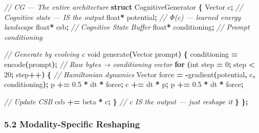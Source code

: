 \documentclass[
  11pt,
  a4paper,
]{article}
\newenvironment{Shaded}{\begin{snugshade}}{\end{snugshade}}
\newcommand{\CommentTok}[1]{\textcolor[rgb]{0.56,0.35,0.01}{\textit{#1}}}
\newcommand{\ControlFlowTok}[1]{\textcolor[rgb]{0.13,0.29,0.53}{\textbf{#1}}}
\newcommand{\DataTypeTok}[1]{\textcolor[rgb]{0.13,0.29,0.53}{#1}}
\newcommand{\DecValTok}[1]{\textcolor[rgb]{0.00,0.00,0.81}{#1}}
\newcommand{\FloatTok}[1]{\textcolor[rgb]{0.00,0.00,0.81}{#1}}
\newcommand{\KeywordTok}[1]{\textcolor[rgb]{0.13,0.29,0.53}{\textbf{#1}}}
\newcommand{\NormalTok}[1]{#1}
\newcommand{\OperatorTok}[1]{\textcolor[rgb]{0.81,0.36,0.00}{\textbf{#1}}}
\begin{document}
\begin{Shaded}
\begin{Highlighting}[]
\CommentTok{// CG — The entire architecture}
\KeywordTok{struct}\NormalTok{ CognitiveGenerator }\OperatorTok{\{}
\NormalTok{    Vector c}\OperatorTok{;}              \CommentTok{// Cognitive state — IS the output}
    \DataTypeTok{float}\OperatorTok{*}\NormalTok{ potential}\OperatorTok{;}      \CommentTok{// Φ(c) — learned energy landscape}
    \DataTypeTok{float}\OperatorTok{*}\NormalTok{ csb}\OperatorTok{;}            \CommentTok{// Cognitive State Buffer}
    \DataTypeTok{float}\OperatorTok{*}\NormalTok{ conditioning}\OperatorTok{;}   \CommentTok{// Prompt conditioning}
    
    \CommentTok{// Generate by evolving c}
    \DataTypeTok{void}\NormalTok{ generate}\OperatorTok{(}\NormalTok{Vector prompt}\OperatorTok{)} \OperatorTok{\{}
\NormalTok{        conditioning }\OperatorTok{=}\NormalTok{ encode}\OperatorTok{(}\NormalTok{prompt}\OperatorTok{);}  \CommentTok{// Raw bytes → conditioning vector}
        \ControlFlowTok{for} \OperatorTok{(}\DataTypeTok{int}\NormalTok{ step }\OperatorTok{=} \DecValTok{0}\OperatorTok{;}\NormalTok{ step }\OperatorTok{\textless{}} \DecValTok{20}\OperatorTok{;}\NormalTok{ step}\OperatorTok{++)} \OperatorTok{\{}
            \CommentTok{// Hamiltonian dynamics}
\NormalTok{            Vector force }\OperatorTok{=} \OperatorTok{{-}}\NormalTok{gradient}\OperatorTok{(}\NormalTok{potential}\OperatorTok{,}\NormalTok{ c}\OperatorTok{,}\NormalTok{ conditioning}\OperatorTok{);}
\NormalTok{            p }\OperatorTok{+=} \FloatTok{0.5} \OperatorTok{*}\NormalTok{ dt }\OperatorTok{*}\NormalTok{ force}\OperatorTok{;}
\NormalTok{            c }\OperatorTok{+=}\NormalTok{ dt }\OperatorTok{*}\NormalTok{ p}\OperatorTok{;}
\NormalTok{            p }\OperatorTok{+=} \FloatTok{0.5} \OperatorTok{*}\NormalTok{ dt }\OperatorTok{*}\NormalTok{ force}\OperatorTok{;}
            
            \CommentTok{// Update CSB}
\NormalTok{            csb }\OperatorTok{+=}\NormalTok{ beta }\OperatorTok{*}\NormalTok{ c}\OperatorTok{;}
        \OperatorTok{\}}
        \CommentTok{// c IS the output — just reshape it}
    \OperatorTok{\}}
\OperatorTok{\};}
\end{Highlighting}
\end{Shaded}

\subsubsection{5.2 Modality-Specific
Reshaping}\label{modality-specific-reshaping}
\end{document}
